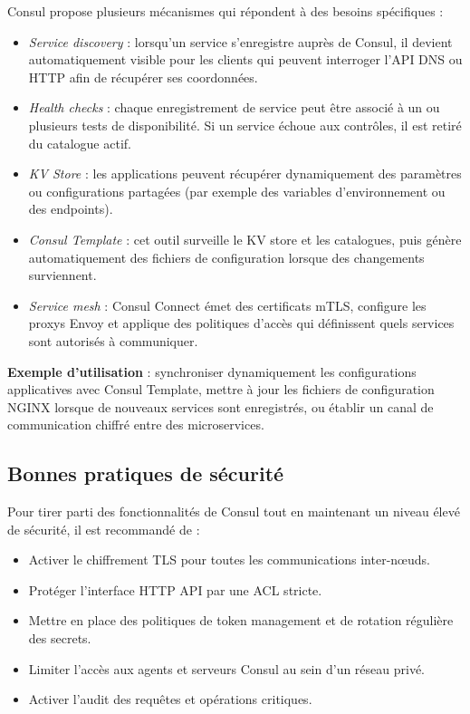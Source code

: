 Consul propose plusieurs mécanismes qui répondent à des besoins spécifiques :

\begin{itemize}
	\item \emph{Service discovery} : lorsqu’un service s’enregistre auprès de Consul, il devient automatiquement visible pour les clients qui peuvent interroger l’API DNS ou HTTP afin de récupérer ses coordonnées.
	\item \emph{Health checks} : chaque enregistrement de service peut être associé à un ou plusieurs tests de disponibilité. Si un service échoue aux contrôles, il est retiré du catalogue actif.
	\item \emph{KV Store} : les applications peuvent récupérer dynamiquement des paramètres ou configurations partagées (par exemple des variables d’environnement ou des endpoints).
	\item \emph{Consul Template} : cet outil surveille le KV store et les catalogues, puis génère automatiquement des fichiers de configuration lorsque des changements surviennent.
	\item \emph{Service mesh} : Consul Connect émet des certificats mTLS, configure les proxys Envoy et applique des politiques d’accès qui définissent quels services sont autorisés à communiquer.
\end{itemize}

\textbf{Exemple d’utilisation} : synchroniser dynamiquement les configurations applicatives avec Consul Template, mettre à jour les fichiers de configuration NGINX lorsque de nouveaux services sont enregistrés, ou établir un canal de communication chiffré entre des microservices.

\subsection{Bonnes pratiques de sécurité}

Pour tirer parti des fonctionnalités de Consul tout en maintenant un niveau élevé de sécurité, il est recommandé de :
\begin{itemize}
	\item Activer le chiffrement TLS pour toutes les communications inter-nœuds.
	\item Protéger l’interface HTTP API par une ACL stricte.
	\item Mettre en place des politiques de token management et de rotation régulière des secrets.
	\item Limiter l’accès aux agents et serveurs Consul au sein d’un réseau privé.
	\item Activer l’audit des requêtes et opérations critiques.
\end{itemize}

